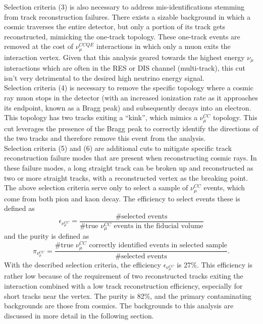 Selection criteria (3) is also necessary to address mis-identifications stemming from track reconstruction failures. There exists a sizable background in which a cosmic traverses the entire detector, but only a portion of its track gets reconstructed, mimicking the one-track topology. These one-track events are removed at the cost of $\nu_\mu^{CCQE}$ interactions in which only a muon exits the interaction vertex. Given that this analysis geared towards the highest energy $\nu_\mu$ interactions which are often in the RES or DIS channel (multi-track), this cut isn't very detrimental to the desired high neutrino energy signal.\\

Selection criteria (4) is necessary to remove the specific topology where a cosmic ray muon stops in the detector (with an increased ionization rate as it approaches its endpoint, known as a Bragg peak) and subsequently decays into an electron. This topology has two tracks exiting a ``kink'', which mimics a $\nu_\mu^{CC}$ topology. This cut leverages the presence of the Bragg peak to correctly identify the directions of the two tracks and therefore remove this event from the analysis.\\

Selection criteria (5) and (6) are additional cuts to mitigate specific track reconstruction failure modes that are present when reconstructing cosmic rays. In these failure modes, a long straight track can be broken up and reconstructed as two or more straight tracks, with a reconstructed vertex as the breaking point.\\

The above selection criteria serve only to select a sample of $\nu_\mu^{CC}$ events, which come from both pion and kaon decay. The efficiency to select events these is defined as
\begin{equation}
\epsilon_{\nu_\mu^{CC}} = \frac{\text{\# selected events}}{\text{\# true $\nu_\mu^{CC}$ events in the fiducial volume}}
\end{equation}
and the purity is defined as
\begin{equation}
\pi_{\nu_\mu^{CC}} = \frac{\text{\# true $\nu_\mu^{CC}$ correctly identified events in selected sample}}{\text{\# selected events}}.
\end{equation}
With the described selection criteria, the efficiency $\epsilon_{\nu_\mu^{CC}}$ is 27\%. This efficiency is rather low because of the requirement of two reconstructed tracks exiting the interaction combined with a low track reconstruction efficiency, especially for short tracks near the vertex. The purity is 82\%, and the primary contaminating backgrounds are those from cosmics. The backgrounds to this analysis are discussed in more detail in the following section.

